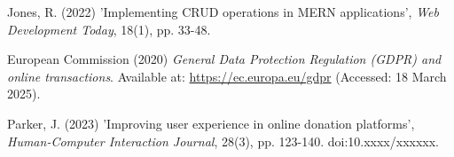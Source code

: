 \begin{thebibliography}{99}
 Jones, R. (2022) 'Implementing CRUD operations in MERN applications', \textit{Web Development Today}, 18(1), pp. 33-48.

 European Commission (2020) \textit{General Data Protection Regulation (GDPR) and online transactions}. Available at: \url{https://ec.europa.eu/gdpr} (Accessed: 18 March 2025).

 Parker, J. (2023) 'Improving user experience in online donation platforms', \textit{Human-Computer Interaction Journal}, 28(3), pp. 123-140. doi:10.xxxx/xxxxxx.

\end{thebibliography}
